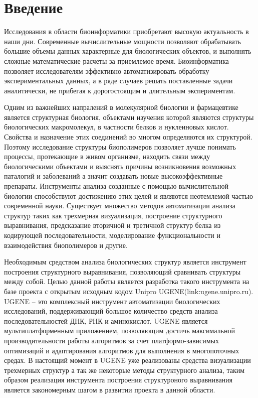 \documentclass[a4paper, 12pt, titlepage, utf8]{extarticle}
\let\oldsection\section         %
\renewcommand{\section}{\newpage\oldsection}
\begin{document}
\tableofcontents
\newpage

\section{Введение}	%

Исследования в области биоинформатики приобретают высокую актуальность в наши дни. Современные вычислительные мощности позволяют обрабатывать большие объемы данных характерные для биологических объектов, и выполнять сложные математические расчеты за приемлемое время. Биоинформатика позволяет исследователям эффективно автоматизировать обработку экспериментальных данных, а в ряде случаев решать поставленные задачи аналитически, не прибегая к дорогостоящим и длительным экспериментам.

Одним из важнейших напралений в молекулярной биологии и фармацевтике является структурная биология, объектами изучения которой являются структуры биологических макромолекул, в частности белков и нуклеиновых кислот. Свойства и назначение этих соединений во многом определяются их структурой. Поэтому исследование структуры биополимеров позволяет лучше понимать процессы, протекающие в живом организме, находить связи между биологическими объектами и выяснять причины возникновения возможных паталогий и заболеваний а значит создавать новые высокоэффективные препараты. Инструменты анализа созданные с помощью вычислительной биологии способствуют достижению этих целей и являются неотемлемой частью современной науки. Существует множество методов автоматизации анализа структур таких как трехмерная визуализация, построение структурного выравнивания, предсказание вторичной и третичной структур белка из кодирующей последовательности, моделирование функциональности и взаимодействия биополимеров и другие.

Необходимым средством анализа биологических структур является инструмент построения структурного выравнивания, позволяющий сравнивать структуры между собой. Целью данной работы является разработка такого инструмента на базе проекта с открытым исходным кодом Unipro UGENE(link:ugene.unipro.ru). UGENE -- это комплексный инструмент автоматизации биологических исследований, поддерживающий большое количество средств анализа последовательностей ДНК, РНК и аминокислот. UGENE является мультиплатформенным приложением, позволяющим достичь максимальной производительности работы алгоритмов за счет платформо-зависимых оптимизаций и адаптирования алгоритмов для выполнения в многопоточных средах. В настоящий момент в UGENE уже реализованы средства визуализации трехмерных структур а так же некоторые методы структурного анализа, таким образом реализация инструмента построения структуроного выравнивания является закономерным шагом в развитии проекта в данной области.
\end{document}
